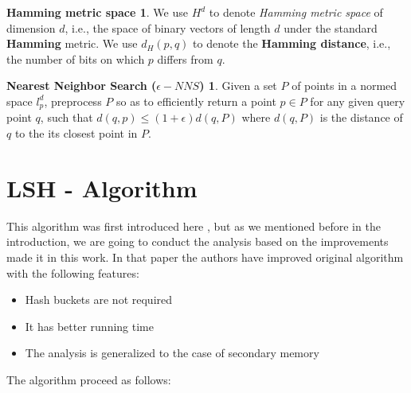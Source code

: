 \documentclass[12pt, a4paper]{article}
\theoremstyle{definition}
\newtheorem*{hamming}{Hamming metric space}
\newtheorem*{nns}{Nearest Neighbor Search ($\epsilon-NNS$)}
\begin{document}
\begin{hamming}
  We use $H^d$ to denote \textit{Hamming metric space} of dimension $d$, i.e., the space of binary vectors of length $d$ under the standard \textbf{Hamming} metric. We use $d_H(p,q)$ to denote the \textbf{Hamming distance}, i.e., the number of bits on which $p$ differs from $q$.
\end{hamming}

\begin{nns}
  Given a set $P$ of points in a normed space $l^{d}_p$, preprocess $P$ so as to efficiently return a point $p \in P$ for any given query point $q$, such that $d(q, p) \leq (1 + \epsilon)d(q,P)$ where $d(q, P)$ is the distance of $q$ to the its closest point
in $P$.
\end{nns}

\section{LSH - Algorithm}
This algorithm was first introduced here \cite{motwani_lsh}, but as we mentioned before in the introduction, we are going to conduct the analysis based on the improvements made it in this \cite{gionis_sim_search} work. In that paper the authors have improved original algorithm with the following features:

\begin{itemize}
  \item Hash buckets are not required
  \item It has better running time
  \item The analysis is generalized to the case of secondary memory
\end{itemize}

The algorithm proceed as follows:
\end{document}
